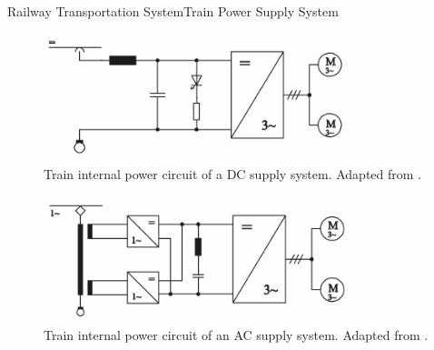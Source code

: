 \begin{frame}{Railway Transportation System}{Train Power Supply System}


\begin{minipage}[t]{0.48\linewidth}
	
	
	\begin{figure}[ht!]
		\centering
		\includegraphics[width=0.8\textwidth,keepaspectratio]{figures/31.PowerS/steimel2008a}
		\caption{Train internal power circuit of a \ac{DC} supply system. Adapted from \cite{steimel2008}.}
	\end{figure}
\end{minipage}\hfill
\begin{minipage}[t]{0.48\linewidth}
	
	
	\begin{figure}[ht!]
		\centering
		\includegraphics[width=0.8\textwidth,keepaspectratio]{figures/31.PowerS/steimel2008b}
		\caption{Train internal power circuit of an \ac{AC} supply system. Adapted from \cite{steimel2008}.}
	\end{figure}
	
	
	
\end{minipage}


\end{frame}
